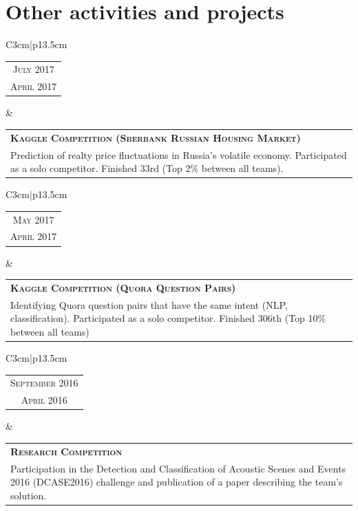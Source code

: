 \section{Other activities and projects}

\begin{tabular}{C{3cm}|p{13.5cm}}
    \begin{tabular}{c}
        \textsc{July 2017}
        \\
        \textsc{April 2017}
    \end{tabular}
    &
    \setlength\extrarowheight{3pt}
    \begin{tabular}{p{13cm}}
        \textsc{\textbf{Kaggle Competition (Sberbank Russian Housing Market)}}
        \\
        Prediction of realty price fluctuations in Russia’s volatile economy. Participated as a solo competitor. Finished 33rd (Top 2\% between all teams).
    \end{tabular}
\end{tabular}


\begin{tabular}{C{3cm}|p{13.5cm}}
    \begin{tabular}{c}
        \textsc{May 2017}
        \\
        \textsc{April 2017}
    \end{tabular}
    &
    \setlength\extrarowheight{3pt}
    \begin{tabular}{p{13cm}}
        \textsc{\textbf{Kaggle Competition (Quora Question Pairs)}}
        \\
        Identifying Quora question pairs that have the same intent (NLP, classification). Participated as a solo competitor. Finished 306th (Top 10\% between all teams)
    \end{tabular}
\end{tabular}


\begin{tabular}{C{3cm}|p{13.5cm}}
    \begin{tabular}{c}
        \textsc{September 2016}
        \\
        \textsc{April 2016}
    \end{tabular}
    &
    \setlength\extrarowheight{3pt}
    \begin{tabular}{p{13cm}}
        \textsc{\textbf{Research Competition}}
        \\
        Participation in the Detection and Classification of Acoustic Scenes and Events 2016 (DCASE2016) challenge and publication of a paper describing the team's solution.
    \end{tabular}
\end{tabular}


